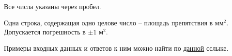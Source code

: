 Все числа указаны через пробел.

\outputfmtSection

Одна строка, содержащая одно целове число -- площадь препятствия в мм$^2$.
Допускается погрешность в $\pm 1$ м$^2$.

\exampleSection

Примеры входных данных и ответов к ним можно найти по \href{http://bit.ly/2Re5l9N}{данной} сслыке.




